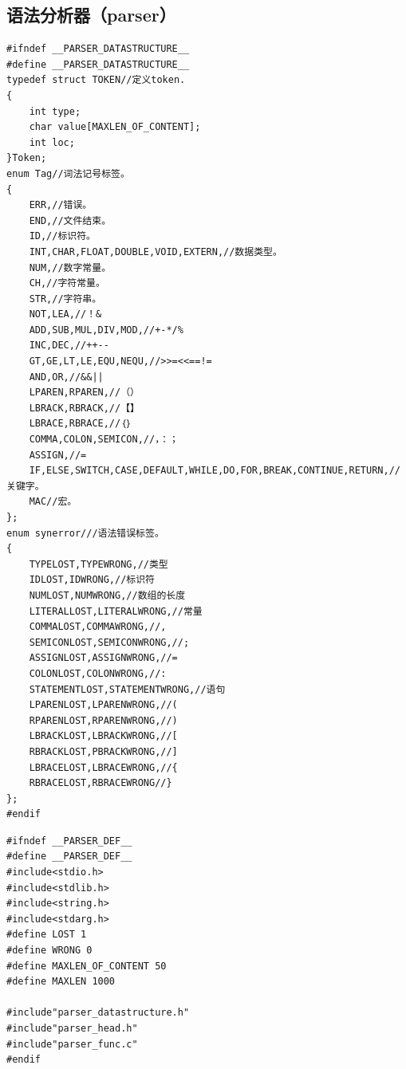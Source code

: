 \documentclass[supercite]{Experimental_Report}
\theoremstyle{definition}
\begin{document}
\subsection{语法分析器（parser）}
\begin{lstlisting}[title=parser\_datastructure,frame=none]
#ifndef __PARSER_DATASTRUCTURE__
#define __PARSER_DATASTRUCTURE__
typedef struct TOKEN//定义token. 
{
	int type;
	char value[MAXLEN_OF_CONTENT];
	int loc;
}Token;
enum Tag//词法记号标签。 
{
	ERR,//错误。 
	END,//文件结束。 
	ID,//标识符。 
	INT,CHAR,FLOAT,DOUBLE,VOID,EXTERN,//数据类型。 
	NUM,//数字常量。 
	CH,//字符常量。 
	STR,//字符串。 
	NOT,LEA,//！& 
	ADD,SUB,MUL,DIV,MOD,//+-*/% 
	INC,DEC,//++--
	GT,GE,LT,LE,EQU,NEQU,//>>=<<==!=
	AND,OR,//&&|| 
	LPAREN,RPAREN,//（） 
	LBRACK,RBRACK,//【】 
	LBRACE,RBRACE,//｛｝ 
	COMMA,COLON,SEMICON,//，：； 
	ASSIGN,//= 
	IF,ELSE,SWITCH,CASE,DEFAULT,WHILE,DO,FOR,BREAK,CONTINUE,RETURN,//关键字。
	MAC//宏。 
};
enum synerror///语法错误标签。 
{
	TYPELOST,TYPEWRONG,//类型 
	IDLOST,IDWRONG,//标识符 
	NUMLOST,NUMWRONG,//数组的长度 
	LITERALLOST,LITERALWRONG,//常量 
	COMMALOST,COMMAWRONG,//, 
	SEMICONLOST,SEMICONWRONG,//;
	ASSIGNLOST,ASSIGNWRONG,//=
	COLONLOST,COLONWRONG,//:
	STATEMENTLOST,STATEMENTWRONG,//语句
	LPARENLOST,LPARENWRONG,//(
	RPARENLOST,RPARENWRONG,//)
	LBRACKLOST,LBRACKWRONG,//[
	RBRACKLOST,PBRACKWRONG,//]
	LBRACELOST,LBRACEWRONG,//{
	RBRACELOST,RBRACEWRONG//}
};
#endif
\end{lstlisting}
\begin{lstlisting}[title=parser\_def,frame=none]
#ifndef __PARSER_DEF__
#define __PARSER_DEF__
#include<stdio.h>
#include<stdlib.h>
#include<string.h>
#include<stdarg.h>
#define LOST 1
#define WRONG 0
#define MAXLEN_OF_CONTENT 50
#define MAXLEN 1000

#include"parser_datastructure.h"
#include"parser_head.h"
#include"parser_func.c"
#endif
\end{lstlisting}
\end{document}
